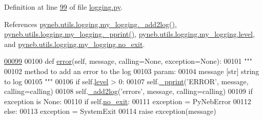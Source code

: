 Definition at line \hyperlink{logging_8py_source_l00099}{99} of file \hyperlink{logging_8py_source}{logging.\-py}.



References \hyperlink{logging_8py_source_l00059}{pyneb.\-utils.\-logging.\-my\-\_\-logging.\-\_\-add2log()}, \hyperlink{logging_8py_source_l00051}{pyneb.\-utils.\-logging.\-my\-\_\-logging.\-\_\-pprint()}, \hyperlink{logging_8py_source_l00041}{pyneb.\-utils.\-logging.\-my\-\_\-logging.\-level}, and \hyperlink{logging_8py_source_l00049}{pyneb.\-utils.\-logging.\-my\-\_\-logging.\-no\-\_\-exit}.


\begin{DoxyCode}
\hypertarget{classpyneb_1_1utils_1_1logging_1_1my__logging_l00099}{}\hyperlink{classpyneb_1_1utils_1_1logging_1_1my__logging_a8d71fe419d7ac8f28ad780518665294b}{00099} 
00100     \textcolor{keyword}{def }\hyperlink{classpyneb_1_1utils_1_1logging_1_1my__logging_a8d71fe419d7ac8f28ad780518665294b}{error}(self, message, calling=None, exception=None):
00101         \textcolor{stringliteral}{"""}
00102 \textcolor{stringliteral}{        method to add an error to the log}
00103 \textcolor{stringliteral}{        param:}
00104 \textcolor{stringliteral}{            message [str] string to log}
00105 \textcolor{stringliteral}{        """}
00106         \textcolor{keywordflow}{if} self.\hyperlink{classpyneb_1_1utils_1_1logging_1_1my__logging_aa70215328c3f7a97a607c584026e144a}{level} > 0:
00107             self.\hyperlink{classpyneb_1_1utils_1_1logging_1_1my__logging_a8f54e897998e958e5e211eb11fa02c4a}{\_pprint}(\textcolor{stringliteral}{'ERROR'}, message, calling=calling)
00108         self.\hyperlink{classpyneb_1_1utils_1_1logging_1_1my__logging_a8de4d2383bfa53411876a066e1bf72de}{\_add2log}(\textcolor{stringliteral}{'errors'}, message, calling=calling)
00109         \textcolor{keywordflow}{if} exception \textcolor{keywordflow}{is} \textcolor{keywordtype}{None}:
00110             \textcolor{keywordflow}{if} self.\hyperlink{classpyneb_1_1utils_1_1logging_1_1my__logging_aa84eff388fc826a600e063d8cf7c4f63}{no\_exit}:
00111                 exception = PyNebError
00112             \textcolor{keywordflow}{else}:
00113                 exception = SystemExit
00114         \textcolor{keywordflow}{raise} exception(message)
              
\end{DoxyCode}
